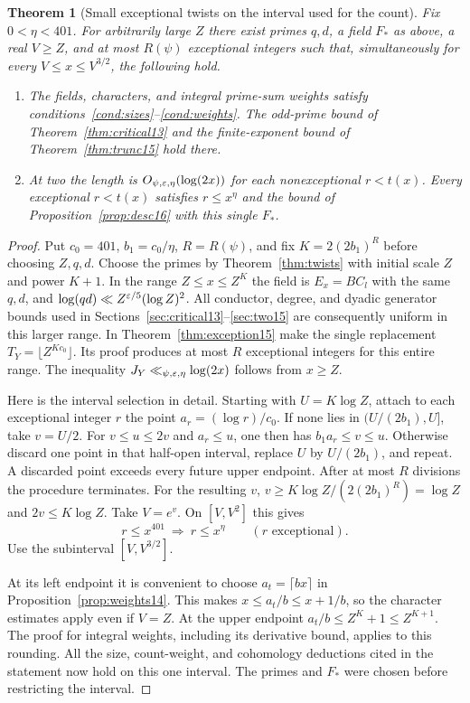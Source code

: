 \documentclass[a4paper,11pt]{article}
\newtheorem{theorem}[proposition]{Theorem}
\theoremstyle{definition}
\theoremstyle{remark}
\numberwithin{equation}{section}
\begin{document}
\begin{theorem}[Small exceptional twists on the interval used for the count]\label{thm:common16}
Fix \(0<\eta<401\). For arbitrarily large \(Z\) there exist primes \(q,d\), a field \(F_*\) as above, a real \(V\ge Z\), and at most \(R(\psi)\) exceptional integers such that, simultaneously for every \(V\le x\le V^{3/2}\), the following hold.
\begin{enumerate}
\item The fields, characters, and integral prime-sum weights satisfy conditions~\ref{cond:sizes}--\ref{cond:weights}. The odd-prime bound of Theorem~\ref{thm:critical13} and the finite-exponent bound of Theorem~\ref{thm:trunc15} hold there.
\item At two the length is \(O_{\psi,\varepsilon,\eta}(\log(2x))\) for each nonexceptional \(r<t(x)\). Every exceptional \(r<t(x)\) satisfies \(r\le x^\eta\) and the bound of Proposition~\ref{prop:desc16} with this single \(F_*\).
\end{enumerate}
\end{theorem}
\begin{proof}
Put \(c_0=401\), \(b_1=c_0/\eta\), \(R=R(\psi)\), and fix \(K=2(2b_1)^R\) before choosing \(Z,q,d\). Choose the primes by Theorem~\ref{thm:twists} with initial scale \(Z\) and power \(K+1\). In the range \(Z\le x\le Z^K\) the field is \(E_x=BC_l\) with the same \(q,d\), and \(\log(qd)\ll Z^{\varepsilon/5}(\log Z)^2\). All conductor, degree, and dyadic generator bounds used in Sections~\ref{sec:critical13}--\ref{sec:two15} are consequently uniform in this larger range. In Theorem~\ref{thm:exception15} make the single replacement \(T_Y=\lfloor Z^{Kc_0}\rfloor\). Its proof produces at most \(R\) exceptional integers for this entire range. The inequality \(J_Y\ll_{\psi,\varepsilon,\eta}\log(2x)\) follows from \(x\ge Z\).

Here is the interval selection in detail. Starting with \(U=K\log Z\), attach to each exceptional integer \(r\) the point \(a_r=(\log r)/c_0\). If none lies in \((U/(2b_1),U]\), take \(v=U/2\). For \(v\le u\le2v\) and \(a_r\le u\), one then has \(b_1a_r\le v\le u\). Otherwise discard one point in that half-open interval, replace \(U\) by \(U/(2b_1)\), and repeat. A discarded point exceeds every future upper endpoint. After at most \(R\) divisions the procedure terminates. For the resulting \(v\), \(v\ge K\log Z/(2(2b_1)^R)=\log Z\) and \(2v\le K\log Z\). Take \(V=e^v\). On \([V,V^2]\) this gives
\[
             r\le x^{401}\ \Longrightarrow\ r\le x^\eta
                   \qquad(r\text{ exceptional}).
\]
Use the subinterval \([V,V^{3/2}]\).

At its left endpoint it is convenient to choose \(a_t=\lceil bx\rceil\) in Proposition~\ref{prop:weights14}. This makes \(x\le a_t/b\le x+1/b\), so the character estimates apply even if \(V=Z\). At the upper endpoint \(a_t/b\le Z^K+1\le Z^{K+1}\). The proof for integral weights, including its derivative bound, applies to this rounding. All the size, count-weight, and cohomology deductions cited in the statement now hold on this one interval. The primes and \(F_*\) were chosen before restricting the interval.
\end{proof}
\end{document}
